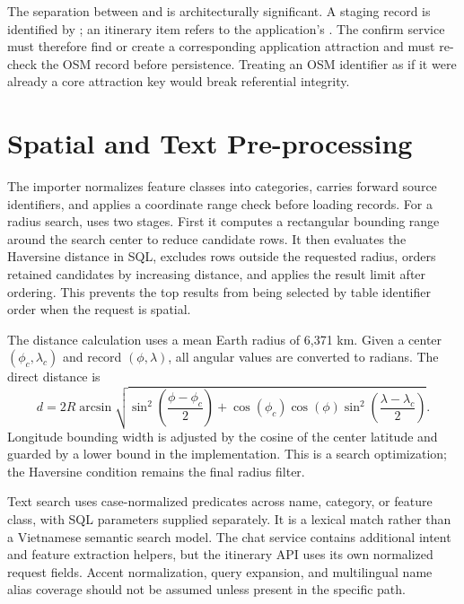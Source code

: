 The separation between  and  is architecturally significant. A staging record is identified by ; an itinerary item refers to the application's . The confirm service must therefore find or create a corresponding application attraction and must re-check the OSM record before persistence. Treating an OSM identifier as if it were already a core attraction key would break referential integrity.
\section{Spatial and Text Pre-processing}

The importer normalizes feature classes into categories, carries forward source identifiers, and applies a coordinate range check before loading records. For a radius search,  uses two stages. First it computes a rectangular bounding range around the search center to reduce candidate rows. It then evaluates the Haversine distance in SQL, excludes rows outside the requested radius, orders retained candidates by increasing distance, and applies the result limit after ordering. This prevents the top results from being selected by table identifier order when the request is spatial.

The distance calculation uses a mean Earth radius of 6,371 km. Given a center $(\phi_c,\lambda_c)$ and record $(\phi,\lambda)$, all angular values are converted to radians. The direct distance is
\begin{equation}
    d = 2R\arcsin\sqrt{
        \sin^2\left(\frac{\phi-\phi_c}{2}\right)
        + \cos(\phi_c)\cos(\phi)
          \sin^2\left(\frac{\lambda-\lambda_c}{2}\right)}.
\end{equation}
Longitude bounding width is adjusted by the cosine of the center latitude and guarded by a lower bound in the implementation. This is a search optimization; the Haversine condition remains the final radius filter.

Text search uses case-normalized  predicates across name, category, or feature class, with SQL parameters supplied separately. It is a lexical match rather than a Vietnamese semantic search model. The chat service contains additional intent and feature extraction helpers, but the itinerary API uses its own normalized request fields. Accent normalization, query expansion, and multilingual name alias coverage should not be assumed unless present in the specific path.

